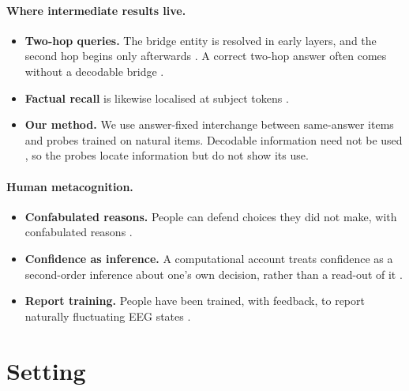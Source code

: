 \documentclass[11pt]{article}
\begin{document}
\paragraph{Where intermediate results live.}
\begin{itemize}
\item \textbf{Two-hop queries.} The bridge entity is resolved in early layers, and the second hop begins only afterwards \citep{biran2024hopping}. A correct two-hop answer often comes without a decodable bridge \citep{bhan2026neurofaith}.
\item \textbf{Factual recall} is likewise localised at subject tokens \citep{meng2022locating,geva2023dissecting}.
\item \textbf{Our method.} We use answer-fixed interchange between same-answer items \citep{geiger2021inducing,zhang2023best} and probes trained on natural items. Decodable information need not be used \citep{elazar2020amnesic}, so the probes locate information but do not show its use.
\end{itemize}

\paragraph{Human metacognition.}
\begin{itemize}
\item \textbf{Confabulated reasons.} People can defend choices they did not make, with confabulated reasons \citep{johansson2005failure}.
\item \textbf{Confidence as inference.} A computational account treats confidence as a second-order inference about one's own decision, rather than a read-out of it \citep{fleming2017self}.
\item \textbf{Report training.} People have been trained, with feedback, to report naturally fluctuating EEG states \citep{frederick2012psychophysics}.
\end{itemize}

\section{Setting}
\label{sec:setting}
\end{document}
